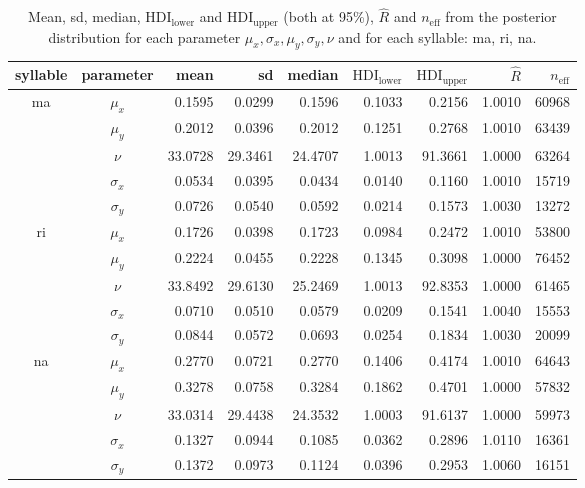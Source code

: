 \documentclass[11pt]{article}
\begin{document}
\begin{table}[ht]
\centering
\footnotesize
\caption{Mean, sd, median, $\textrm{HDI}_{\text{lower}}$ and $\textrm{HDI}_{\text{upper}}$ (both at 95\%), $\widehat{R}$ and $n_{\text{eff}}$ from the posterior distribution for each parameter $\mu_x, \sigma_x, \mu_y, \sigma_y, \nu$ and for each syllable: ma, ri, na. }
\begin{tabular}{ccrrrrrrr}
  \hline
syllable & parameter & mean & sd & median & $\textrm{HDI}_{\text{lower}}$ & $\textrm{HDI}_{\text{upper}}$ & $\widehat{R}$ & $n_{\text{eff}}$ \\ 
	  \hline
	\multirow{5}{*}{ma} & $\mu_x$ & 0.1595 & 0.0299 & 0.1596 & 0.1033 & 0.2156 & 1.0010 & 60968 \\ 
	   & $\mu_y$ & 0.2012 & 0.0396 & 0.2012 & 0.1251 & 0.2768 & 1.0010 & 63439 \\ 
	   & $\nu$ & 33.0728 & 29.3461 & 24.4707 & 1.0013 & 91.3661 & 1.0000 & 63264 \\ 
	   & $\sigma_x$ & 0.0534 & 0.0395 & 0.0434 & 0.0140 & 0.1160 & 1.0010 & 15719 \\ 
	   & $\sigma_y$ & 0.0726 & 0.0540 & 0.0592 & 0.0214 & 0.1573 & 1.0030 & 13272 \\ 
	   \hline
	\multirow{5}{*}{ri} & $\mu_x$ & 0.1726 & 0.0398 & 0.1723 & 0.0984 & 0.2472 & 1.0010 & 53800 \\ 
	   & $\mu_y$ & 0.2224 & 0.0455 & 0.2228 & 0.1345 & 0.3098 & 1.0000 & 76452 \\ 
	   & $\nu$ & 33.8492 & 29.6130 & 25.2469 & 1.0013 & 92.8353 & 1.0000 & 61465 \\ 
	   & $\sigma_x$ & 0.0710 & 0.0510 & 0.0579 & 0.0209 & 0.1541 & 1.0040 & 15553 \\ 
	   & $\sigma_y$ & 0.0844 & 0.0572 & 0.0693 & 0.0254 & 0.1834 & 1.0030 & 20099 \\ 
	   \hline
	\multirow{5}{*}{na} & $\mu_x$ & 0.2770 & 0.0721 & 0.2770 & 0.1406 & 0.4174 & 1.0010 & 64643 \\ 
	   & $\mu_y$ & 0.3278 & 0.0758 & 0.3284 & 0.1862 & 0.4701 & 1.0000 & 57832 \\ 
	   & $\nu$ & 33.0314 & 29.4438 & 24.3532 & 1.0003 & 91.6137 & 1.0000 & 59973 \\ 
	   & $\sigma_x$ & 0.1327 & 0.0944 & 0.1085 & 0.0362 & 0.2896 & 1.0110 & 16361 \\ 
	   & $\sigma_y$ & 0.1372 & 0.0973 & 0.1124 & 0.0396 & 0.2953 & 1.0060 & 16151 \\ 
	   \hline
\end{tabular}
\label{tab:mcmc_results}
\end{table}
\end{document}
